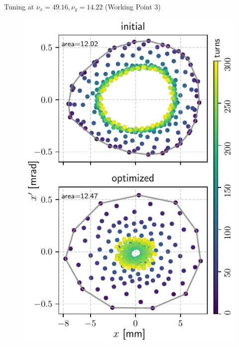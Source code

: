\documentclass[aspectratio=169]{beamer}
\begin{document}
\begin{frame}{Tuning at $\nu_x = 49.16, \nu_y = 14.22$ (Working Point 3)}
\begin{minipage}{0.44\textwidth}
\begin{figure}
            \includegraphics[height=0.9\textheight]{wp3_phase_space.pdf}
        \end{figure}
    \end{minipage}
\end{frame}

\end{document}
